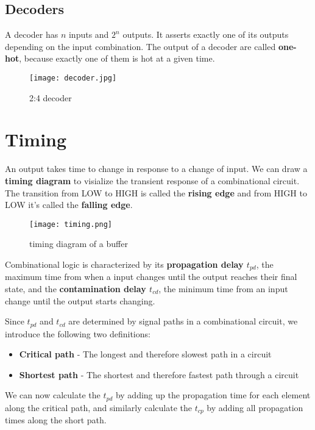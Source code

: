 \subsection{Decoders}
A decoder has $n$ inputs and $2^n$ outputs. It asserts exactly one of its outputs depending on the input combination.
The output of a decoder are called \textbf{one-hot}, because exactly one of them is hot at a given time.

\begin{figure}[h]
    \centering
    \texttt{[image: decoder.jpg]}
    \caption{2:4 decoder}
\end{figure}

\pagebreak
\section{Timing}
An output takes time to change in response to a change of input. We can draw a \textbf{timing diagram} to visialize the
transient response of a combinational circuit. The transition from LOW to HIGH is called the \textbf{rising edge} and from HIGH
to LOW it's called the \textbf{falling edge}. 

\begin{figure}[h]
    \centering
    \texttt{[image: timing.png]}
    \caption{timing diagram of a buffer}
\end{figure}

Combinational logic is characterized by its \textbf{propagation delay $t_{pd}$}, the maximum time from when a input changes
until the output reaches their final state, and the \textbf{contamination delay $t_{cd}$}, the minimum time from an input 
change until the output starts changing.

Since $t_{pd}$ and $t_{cd}$ are determined by signal paths in a combinational circuit, we introduce the following two 
definitions:

\begin{itemize}
    \item \textbf{Critical path} - The longest and therefore slowest path in a circuit
    \item \textbf{Shortest path} - The shortest and therefore fastest path through a circuit
\end{itemize}

We can now calculate the $t_{pd}$ by adding up the propagation time for each element along the critical path, and similarly calculate 
the $t_{cp}$ by adding all propagation times along the short path.